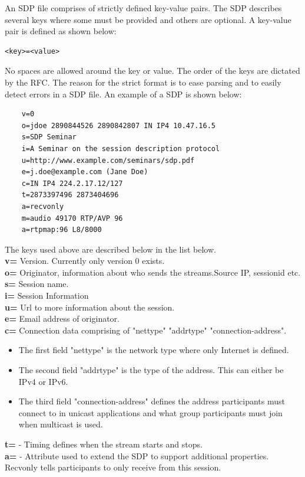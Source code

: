 An SDP file comprises of strictly defined key-value pairs. The SDP describes several keys where some must be provided and others are optional. A key-value pair is defined as shown below:
\begin{verbatim}
<key>=<value>
\end{verbatim}

No spaces are allowed around the key or value.
The order of the keys are dictated by the RFC. The reason for the strict format is to ease parsing and to easily detect errors in a SDP file. An example of a SDP is shown below:

\begin{verbatim}
    v=0
    o=jdoe 2890844526 2890842807 IN IP4 10.47.16.5
    s=SDP Seminar
    i=A Seminar on the session description protocol
    u=http://www.example.com/seminars/sdp.pdf
    e=j.doe@example.com (Jane Doe)
    c=IN IP4 224.2.17.12/127
    t=2873397496 2873404696
    a=recvonly
    m=audio 49170 RTP/AVP 96
    a=rtpmap:96 L8/8000
\end{verbatim}
The keys used above are described below in the list below. \\
\textbf{v=} Version. Currently only version 0 exists. \\
\textbf{o=} Originator, information about who sends the streams.Source IP, sessionid etc. \\
\textbf{s=} Session name. \\
\textbf{i=} Session Information \\
\textbf{u=} Url to more information about the session.\\
\textbf{e=} Email address of originator.\\
\textbf{c=} Connection data comprising of "nettype" "addrtype" "connection-address".
\begin{itemize}
	\item The first field "nettype" is the network type where only Internet is defined. 
	\item The second field "addrtype" is the type of the address. This can either be IPv4 or IPv6.
	\item The third field "connection-address" defines the address participants must connect to in unicast applications and what group participants must join when multicast is used.
\end{itemize}
\textbf{t=} - Timing defines when the stream starts and stops. \\
\textbf{a=} - Attribute used to extend the SDP to support additional properties. Recvonly tells participants to only receive from this session. \\
